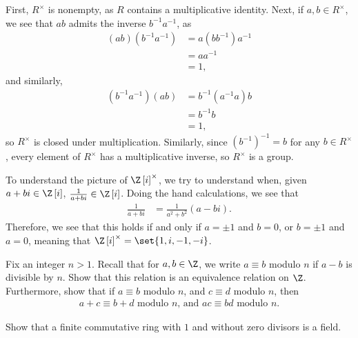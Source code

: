\documentclass[10pt]{mypackage}
\begin{document}
\begin{solution}
  First, $R^{\times}$ is nonempty, as $R$ contains a multiplicative identity. Next, if $a,b\in R^{\times}$, we see that $ab$ admits the inverse $b^{-1}a^{-1}$, as
  \begin{align*}
    \left( ab \right)\left( b^{-1}a^{-1} \right) &= a\left( bb^{-1} \right)a^{-1}\\
                                                 &= aa^{-1}\\
                                                 &= 1,
  \end{align*}
  and similarly,
  \begin{align*}
    \left( b^{-1}a^{-1} \right)\left( ab \right) &= b^{-1}\left( a^{-1}a \right)b\\
                                                 &= b^{-1}b\\
                                                 &= 1,
  \end{align*}
  so $R^{\times}$ is closed under multiplication. Similarly, since $\left( b^{-1} \right)^{-1} = b$ for any $b\in R^{\times}$, every element of $R^{\times}$ has a multiplicative inverse, so $R^{\times}$ is a group.\newline

  To understand the picture of $\Z\left[ i \right]^{\times}$, we try to understand when, given $a+bi\in \Z\left[ i \right]$, $\frac{1}{a+bi}\in \Z\left[ i \right]$. Doing the hand calculations, we see that
  \begin{align*}
    \frac{1}{a+bi} &= \frac{1}{a^2+b^2} \left( a-bi \right).
  \end{align*}
  Therefore, we see that this holds if and only if $a=\pm 1$ and $b = 0$, or $b = \pm 1$ and $a = 0$, meaning that $\Z\left[ i \right]^{\times} = \set{1,i,-1,-i}$.
\end{solution}
\begin{problem}[Problem 3]
  Fix an integer $n > 1$. Recall that for $a,b\in \Z$, we write $a \equiv b$ modulo $n$ if $a-b$ is divisible by $n$. Show that this relation is an equivalence relation on $\Z$. Furthermore, show that if $a\equiv b$ modulo $n$, and $c\equiv d$ modulo $n$, then
  \begin{align*}
    a+c \equiv b+d\text{ modulo $n$, and } ac\equiv bd\text{ modulo $n$.}
  \end{align*}
\end{problem}
\begin{problem}[Problem 4]
  Show that a finite commutative ring with $1$ and without zero divisors is a field.
\end{problem}
\end{document}
